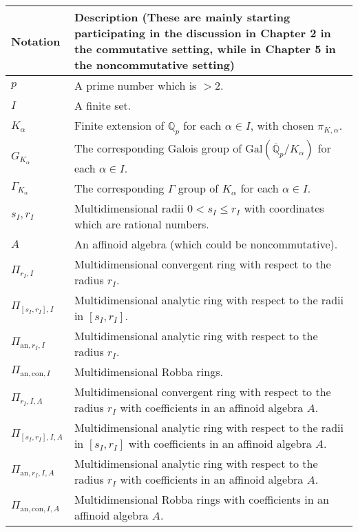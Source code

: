 \documentclass[12pt]{amsart}
\theoremstyle{definition}
\numberwithin{equation}{section}
\begin{document}
\begin{center}
\begin{tabularx}{\linewidth}{lX}
Notation & Description (These are mainly starting participating in the discussion in Chapter 2 in the commutative setting, while in Chapter 5 in the noncommutative setting)\\
\hline
$p$    & A prime number which is $>2$.\\
$I$    & A finite set. \\
$K_\alpha$   & Finite extension of $\mathbb{Q}_p$ for each $\alpha\in I$, with chosen $\pi_{K,\alpha}$.\\
$G_{K_{\alpha}}$ & The corresponding Galois group of $\mathrm{Gal}(\overline{\mathbb{Q}}_p/K_\alpha)$ for each $\alpha\in I$.\\
$\Gamma_{K_{\alpha}}$ & The corresponding $\Gamma$ group of $K_\alpha$ for each $\alpha\in I$.\\
$s_I,r_I$ & Multidimensional radii $0<s_I\leq r_I$ with coordinates which are rational numbers.\\
$A$  & An affinoid algebra (which could be noncommutative).\\
$\Pi_{r_I,I}$ & Multidimensional convergent ring with respect to the radius $r_I$.\\
$\Pi_{[s_I,r_I],I}$ & Multidimensional analytic ring with respect to the radii in $[s_I,r_I]$.\\
$\Pi_{\mathrm{an},r_I,I}$ & Multidimensional analytic ring with respect to the radius $r_{I}$.\\
$\Pi_{\mathrm{an},\mathrm{con},I}$ & Multidimensional Robba rings.\\
$\Pi_{r_I,I,A}$ & Multidimensional convergent ring with respect to the radius $r_I$ with coefficients in an affinoid algebra $A$.\\
$\Pi_{[s_I,r_I],I,A}$ & Multidimensional analytic ring with respect to the radii in $[s_I,r_I]$ with coefficients in an affinoid algebra $A$.\\
$\Pi_{\mathrm{an},r_I,I,A}$ & Multidimensional analytic ring with respect to the radius $r_{I}$ with coefficients in an affinoid algebra $A$.\\
$\Pi_{\mathrm{an},\mathrm{con},I,A}$ & Multidimensional Robba rings with coefficients in an affinoid algebra $A$.\\



\end{tabularx}
\end{center}
\end{document}
